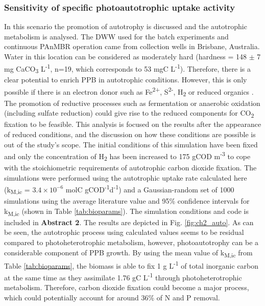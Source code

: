 \subsubsection{Sensitivity of specific photoautotrophic uptake activity}
In this scenario the promotion of autotrophy is discussed and the autotrophic metabolism is analysed. The DWW used for the batch experiments and continuous PAnMBR operation came from collection wells in Brisbane, Australia. Water in this location can be considered as moderately hard (hardness = 148 $\pm$ 7 mg CaCO\textsubscript{3} L\textsuperscript{-1}, n=19, which corresponds to 53 mgC L\textsuperscript{-1}). Therefore, there is a clear potential to enrich PPB in autotrophic conditions. However, this is only possible if there is an electron donor such as Fe\textsuperscript{2+}, S\textsuperscript{2-}, H\textsubscript{2} or reduced organics \cite{McKinlay2011}. The promotion of reductive processes such as fermentation or anaerobic oxidation (including sulfate reduction) could give rise to the reduced components for CO\textsubscript{2} fixation to be feasible. This analysis is focused on the results after the appearance of reduced conditions, and the discussion on how these conditions are possible is out of the study's scope. 
\skippingparagraph
The initial conditions of this simulation have been fixed and only the concentration of H\textsubscript{2} has been increased to 175 gCOD m\textsuperscript{-3} to cope with the stoichiometric requirements of autotrophic carbon dioxide fixation. The simulations were performed using the autotrophic uptake rate calculated here (k\textsubscript{M,ic} = $\mathrm{3.4\times10^{-6}}$ molC gCOD\textsuperscript{-1}d\textsuperscript{-1}) and a Gaussian-random set of 1000 simulations using the average literature value and 95\% confidence intervals for k\textsubscript{M,ic} (shown in Table \ref{tab:bioparams}). The simulation conditions and code is included in \textbf{Abstract 2}. The results are depicted in Fig. \ref{fig:ch2_auto}. As can be seen, the autotrophic process using calculated values seems to be residual compared to photoheterotrophic metabolism, however, photoautotrophy can be a considerable component of PPB growth. By using the mean value of k\textsubscript{M,ic} from Table \ref{tab:bioparams}, the biomass is able to fix 1 g L\textsuperscript{-1} of total inorganic carbon at the same time as they assimilate 1.76 gC L\textsuperscript{-1} through photoheterotrophic metabolism. Therefore, carbon dioxide fixation  could become a major process, which could potentially account for around 36\% of N and P removal. 


